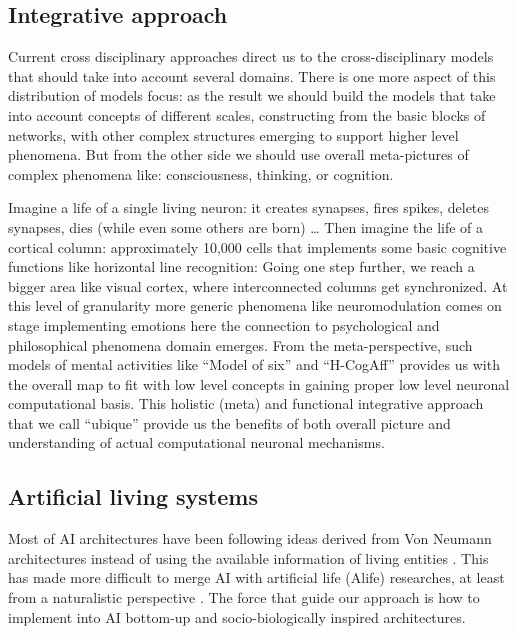 \subsection{Integrative approach}\label{integrative-approach}

Current cross disciplinary approaches direct us to the
cross-disciplinary models that should take into account several domains.
There is one more aspect of this distribution of models focus: as the
result we should build the models that take into account concepts of
different scales, constructing from the basic blocks of networks, with
other complex structures emerging to support higher level phenomena. But
from the other side we should use overall meta-pictures of complex
phenomena like: consciousness, thinking, or cognition.

Imagine a life of a single living neuron: it creates synapses, fires
spikes, deletes synapses, dies (while even some others are born)
\ldots{} Then imagine the life of a cortical column: approximately
10,000 cells that implements some basic cognitive functions like
horizontal line recognition: Going one step further, we reach a bigger
area like visual cortex, where interconnected columns get synchronized.
At this level of granularity more generic phenomena like neuromodulation
comes on stage implementing emotions here the connection to
psychological and philosophical phenomena domain emerges. From the
meta-perspective, such models of mental activities like ``Model of six''
\cite{emotionmachine} and ``H-CogAff'' \cite{sloman2003} provides us
with the overall map to fit with low level concepts in gaining proper
low level neuronal computational basis. This holistic (meta) and
functional integrative approach that we call ``ubique'' provide us the
benefits of both overall picture and understanding of actual
computational neuronal mechanisms.

\subsection{Artificial living systems}\label{artificial-living-systems}

Most of AI architectures have been following ideas derived from Von
Neumann architectures instead of using the available information of
living entities \cite{brooks2}. This has made more difficult to merge AI
with artificial life (Alife) researches, at least from a naturalistic
perspective \cite{alife}. The force that guide our approach is how to
implement into AI bottom-up and socio-biologically inspired
architectures.

